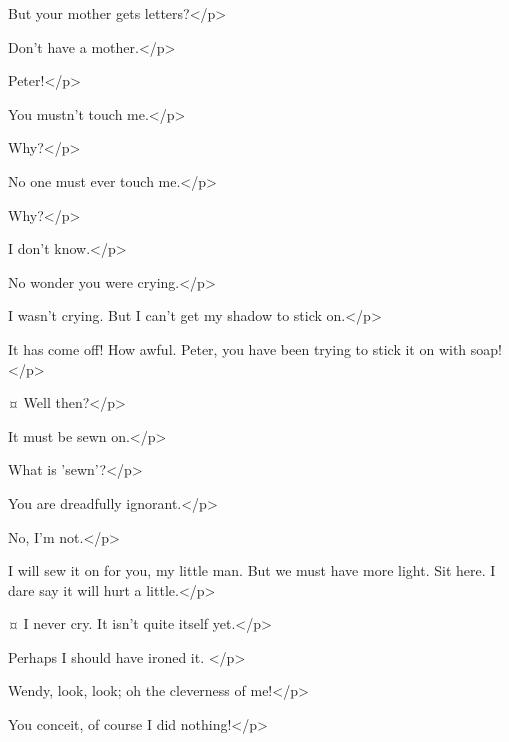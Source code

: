 \wendyspeaks
But your mother gets letters?</p>

\peterspeaks
Don't have a mother.</p>

\wendyspeaks
Peter!</p>


\peterspeaks
You mustn't touch me.</p>

\wendyspeaks
Why?</p>

\peterspeaks
No one must ever touch me.</p>

\wendyspeaks
Why?</p>

\peterspeaks
I don't know.</p>


\wendyspeaks
No wonder you were crying.</p>

\peterspeaks
I wasn't crying.
But I can't get my shadow to stick on.</p>

\wendyspeaks
It has come off!
How awful.
Peter, you have been trying to stick it on with soap!</p>

\peterspeaks {}¤
Well then?</p>

\wendyspeaks
It must be sewn on.</p>

\peterspeaks
What is 'sewn'?</p>

\wendyspeaks
You are dreadfully ignorant.</p>

\peterspeaks
No, I'm not.</p>

\wendyspeaks
I will sew it on for you, my little man.
But we must have more light.
Sit here.
I dare say it will hurt a little.</p>

\peterspeaks {}¤
I never cry.
It isn't quite itself yet.</p>

\wendyspeaks
Perhaps I should have ironed it.
</p>

\peterspeaks
Wendy, look, look; oh the cleverness of me!</p>

\wendyspeaks
You conceit, of course I did nothing!</p>

